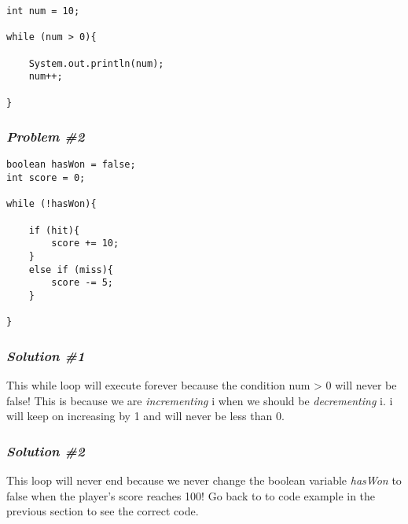 \documentclass[14pt]{extreport}%
\begin{document}
\begin{lstlisting}
int num = 10;

while (num > 0){
    
    System.out.println(num);
    num++;
    
}
\end{lstlisting}{}

\subsubsection{\textit{Problem \#2}}
\begin{lstlisting}
boolean hasWon = false;
int score = 0;

while (!hasWon){
        
    if (hit){
        score += 10;
    }
    else if (miss){
        score -= 5;
    }

}
\end{lstlisting}{}

\subsubsection{\textit{Solution \#1}}
This while loop will execute forever because the condition num > 0 will never be false! This is because we are \textit{incrementing} i when we should be \textit{decrementing} i. i will keep on increasing by 1 and will never be less than 0.

\subsubsection{\textit{Solution \#2}}
This loop will never end because we never change the boolean variable \textit{hasWon} to false when the player's score reaches 100! Go back to to code example in the previous section to see the correct code.
\end{document}
